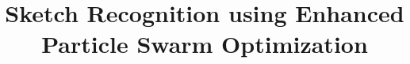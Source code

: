 \documentclass[preprint,1p,times,review]{elsarticle}
\begin{document}





\title{Sketch Recognition using Enhanced Particle Swarm Optimization}


%
\end{document}
